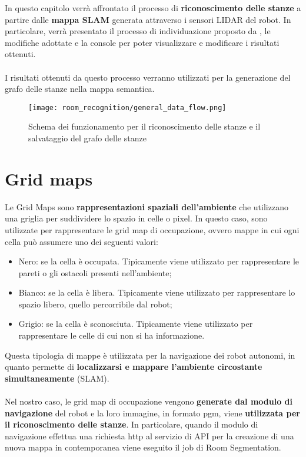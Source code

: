 In questo capitolo verrà affrontato il processo di \textbf{riconoscimento delle stanze} a partire dalle \textbf{mappa SLAM} generata attraverso i sensori LIDAR del robot. In particolare, verrà presentato il processo di individuazione proposto da \cite{mora}, le modifiche adottate e la console per poter visualizzare e modificare i risultati ottenuti.\\\\
I risultati ottenuti da questo processo verranno utilizzati per la generazione del grafo delle stanze nella mappa semantica.

\begin{figure}[H]
  \centering
  \texttt{[image: room\_recognition/general\_data\_flow.png]}
  \caption{Schema dei funzionamento per il riconoscimento delle stanze e il salvataggio del grafo delle stanze}
\end{figure}

\section{Grid maps}
Le Grid Maps sono \textbf{rappresentazioni spaziali dell'ambiente} che utilizzano una griglia per suddividere lo spazio in celle o pixel. In questo caso, sono utilizzate per rappresentare le grid map di occupazione, ovvero mappe in cui ogni cella può assumere uno dei seguenti valori:
\begin{itemize}
  \item Nero: se la cella è occupata. Tipicamente viene utilizzato per rappresentare le pareti o gli ostacoli presenti nell'ambiente;
  \item Bianco: se la cella è libera. Tipicamente viene utilizzato per rappresentare lo spazio libero, quello percorribile dal robot;
  \item Grigio: se la cella è sconosciuta. Tipicamente viene utilizzato per rappresentare le celle di cui non si ha informazione.
\end{itemize}
Questa tipologia di mappe è utilizzata per la navigazione dei robot autonomi, in quanto permette di \textbf{localizzarsi e mappare l'ambiente circostante simultaneamente} (SLAM).\\\\
Nel nostro caso, le grid map di occupazione vengono \textbf{generate dal modulo di navigazione} del robot e la loro immagine, in formato pgm, viene \textbf{utilizzata per il riconoscimento delle stanze}. In particolare, quando il modulo di navigazione effettua una richiesta http  al servizio di API per la creazione di una nuova mappa in contemporanea viene eseguito il job di Room Segmentation.

